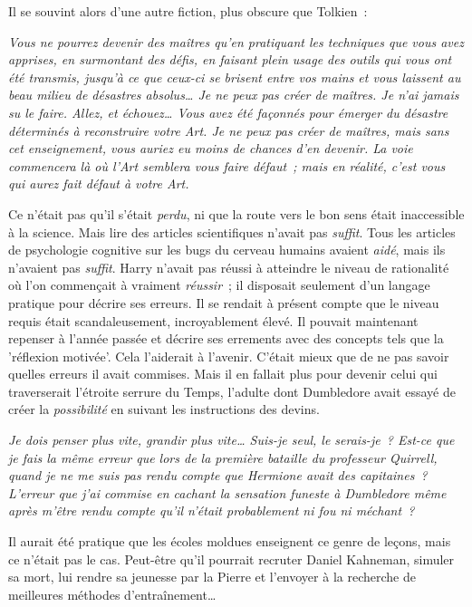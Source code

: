 Il se souvint alors d'une autre fiction, plus obscure que Tolkien~:

\emph{Vous ne pourrez devenir des maîtres qu'en pratiquant les techniques que vous avez apprises, en surmontant des défis, en faisant plein usage des outils qui vous ont été transmis, jusqu'à ce que ceux-ci se brisent entre vos mains et vous laissent au beau milieu de désastres absolus… Je ne peux pas créer de maîtres. Je n'ai jamais su le faire. Allez, et échouez… Vous avez été façonnés pour émerger du désastre déterminés à reconstruire votre Art. Je ne peux pas créer de maîtres, mais sans cet enseignement, vous auriez eu moins de chances d'en devenir. La voie commencera là où l'Art semblera vous faire défaut~; mais en réalité, c'est vous qui aurez fait défaut à votre Art.}

Ce n'était pas qu'il s'était \emph{perdu}, ni que la route vers le bon sens était inaccessible à la science. Mais lire des articles scientifiques n'avait pas \emph{suffit}. Tous les articles de psychologie cognitive sur les bugs du cerveau humains avaient \emph{aidé}, mais ils n'avaient pas \emph{suffit}. Harry n'avait pas réussi à atteindre le niveau de rationalité où l'on commençait à vraiment \emph{réussir}~; il disposait seulement d'un langage pratique pour décrire ses erreurs. Il se rendait à présent compte que le niveau requis était scandaleusement, incroyablement élevé. Il pouvait maintenant repenser à l'année passée et décrire ses errements avec des concepts tels que la 'réflexion motivée'. Cela l'aiderait à l'avenir. C'était mieux que de ne pas savoir quelles erreurs il avait commises. Mais il en fallait plus pour devenir celui qui traverserait l'étroite serrure du Temps, l'adulte dont Dumbledore avait essayé de créer la \emph{possibilité} en suivant les instructions des devins.

\emph{Je dois penser plus vite, grandir plus vite… Suis-je seul, le serais-je~? Est-ce que je fais la même erreur que lors de la première bataille du professeur Quirrell, quand je ne me suis pas rendu compte que Hermione avait des capitaines~? L'erreur que j'ai commise en cachant la sensation funeste à Dumbledore même après m'être rendu compte qu'il n'était probablement ni fou ni méchant~?}

Il aurait été pratique que les écoles moldues enseignent ce genre de leçons, mais ce n'était pas le cas. Peut-être qu'il pourrait recruter Daniel Kahneman, simuler sa mort, lui rendre sa jeunesse par la Pierre et l'envoyer à la recherche de meilleures méthodes d'entraînement…

